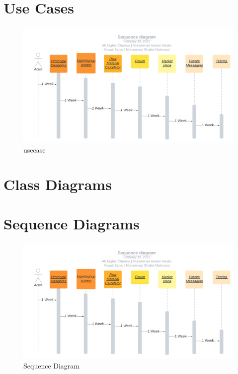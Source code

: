 \documentclass{article}
\begin{document}
\section*{Use Cases}
\centering
\begin{figure}[!h]
    \includegraphics[width=1\linewidth]{Sequence diagram.png}
    \caption{usecase}
    \label{fig:seq}
\end{figure}


\section*{Class Diagrams}

\section*{Sequence Diagrams}
\centering
\begin{figure}[!h]
    \includegraphics[width=1\linewidth]{Sequence diagram.png}
    \caption{Sequence Diagram}
    \label{fig:seq}
\end{figure}
\end{document}
